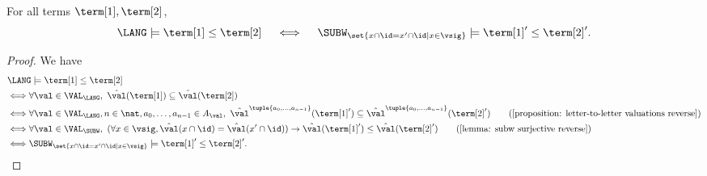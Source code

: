 \begin{lemma}\label{lemma: lang and subw reverse}
    For all terms $\term[1], \term[2]$,
    \[\LANG \models \term[1] \le \term[2] \quad\iff\quad \SUBW_{\set{x \cap \id = x' \cap \id \mid x \in \vsig}} \models \term[1]' \le \term[2]'.\]
\end{lemma}
\begin{proof}
    We have
    \begin{align*}
         & \LANG \models \term[1] \le \term[2]                                                                                                                                                                                                                                           \\
         & \Longleftrightarrow \forall \val \in \VAL_{\LANG},\  \hat{\val}(\term[1]) \subseteq \hat{\val}(\term[2])                                                                                                                                                                      \\
         & \Longleftrightarrow \forall \val \in \VAL_{\LANG}, n \in \nat, a_0, \dots, a_{n-1} \in A_{\val},\  \hat{\val}^{\tuple{a_0, \dots, a_{n-1}}}(\term[1]') \subseteq \hat{\val}^{\tuple{a_0, \dots, a_{n-1}}}(\term[2]')  \tag{\Cref{proposition: letter-to-letter valuations reverse}} \\
         & \Longleftrightarrow \forall \val \in \VAL_{\SUBW},\  (\forall x \in \vsig, \hat{\val}(x \cap \id) = \hat{\val}(x' \cap \id)) \to \hat{\val}(\term[1]') \le \hat{\val}(\term[2]') \tag{\Cref{lemma: subw surjective reverse}}                                                \\
         & \Longleftrightarrow \SUBW_{\set{x \cap \id = x' \cap \id \mid x \in \vsig}} \models \term[1]' \le \term[2]'.
    \end{align*}
\end{proof}


